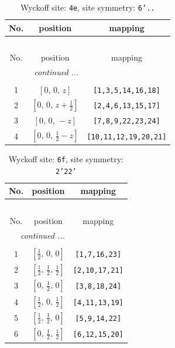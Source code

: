 \documentclass[fleqn,8pt]{jsarticle}
\begin{document}
\renewcommand{\arraystretch}{1.2}
\begin{longtable}{ccc}
\caption{Wyckoff site: {\tt 4e}, site symmetry: {\tt 6'..}}
 \\
 \hline \hline
No. & position & mapping \\ \hline \endfirsthead

\multicolumn{2}{l}{\tablename\ \thetable{}} \\
 \hline \hline
No. & position & mapping \\ \hline \endhead

 \hline \hline
\multicolumn{2}{r}{\footnotesize\it continued ...} \\ \endfoot

 \hline \hline
\multicolumn{2}{r}{} \\ \endlastfoot

1 & $\left[ 0,\, 0,\, z \right]$ & {\tt [1,3,5,14,16,18]} \\ \hline
2 & $\left[ 0,\, 0,\, z + \frac{1}{2} \right]$ & {\tt [2,4,6,13,15,17]} \\ \hline
3 & $\left[ 0,\, 0,\, - z \right]$ & {\tt [7,8,9,22,23,24]} \\ \hline
4 & $\left[ 0,\, 0,\, \frac{1}{2} - z \right]$ & {\tt [10,11,12,19,20,21]} \\
\end{longtable}
\renewcommand{\arraystretch}{1.2}
\begin{longtable}{ccc}
\caption{Wyckoff site: {\tt 6f}, site symmetry: {\tt 2'22'}}
 \\
 \hline \hline
No. & position & mapping \\ \hline \endfirsthead

\multicolumn{2}{l}{\tablename\ \thetable{}} \\
 \hline \hline
No. & position & mapping \\ \hline \endhead

 \hline \hline
\multicolumn{2}{r}{\footnotesize\it continued ...} \\ \endfoot

 \hline \hline
\multicolumn{2}{r}{} \\ \endlastfoot

1 & $\left[ \frac{1}{2},\, 0,\, 0 \right]$ & {\tt [1,7,16,23]} \\ \hline
2 & $\left[ \frac{1}{2},\, \frac{1}{2},\, \frac{1}{2} \right]$ & {\tt [2,10,17,21]} \\ \hline
3 & $\left[ 0,\, \frac{1}{2},\, 0 \right]$ & {\tt [3,8,18,24]} \\ \hline
4 & $\left[ \frac{1}{2},\, 0,\, \frac{1}{2} \right]$ & {\tt [4,11,13,19]} \\ \hline
5 & $\left[ \frac{1}{2},\, \frac{1}{2},\, 0 \right]$ & {\tt [5,9,14,22]} \\ \hline
6 & $\left[ 0,\, \frac{1}{2},\, \frac{1}{2} \right]$ & {\tt [6,12,15,20]} \\
\end{longtable}
\end{document}
